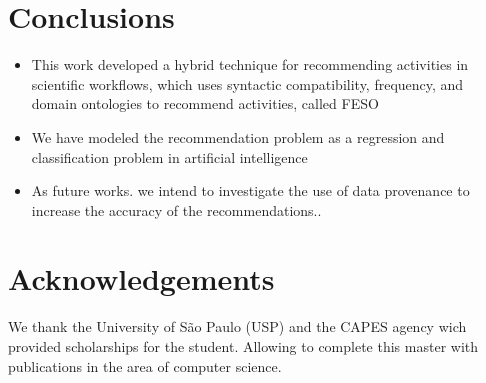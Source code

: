 \documentclass[40pt, a0, portrait]{a0poster}
\begin{document}
\begin{multicols}{2}

\color{Navy} %

\section*{Conclusions}

\begin{itemize}
\item This work developed a hybrid technique for recommending activities in scientific workflows, which uses syntactic compatibility, frequency, and domain ontologies to recommend activities, called FESO
\item We have modeled the recommendation problem as a regression and classification problem in artificial intelligence
\item As future works. we intend to investigate the use of data provenance to increase the accuracy of the recommendations..
\end{itemize}


\section*{Acknowledgements}

We thank the University of São Paulo (USP) and the CAPES agency wich provided scholarships for the student. Allowing to complete this master with publications in the area of computer science.


\end{multicols}
\end{document}
